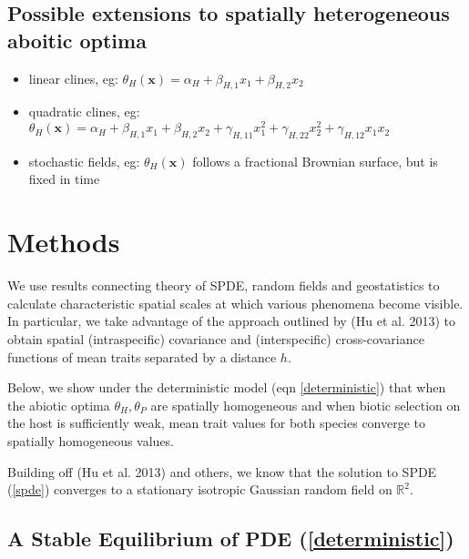 \documentclass{article}
\begin{document}
\hypertarget{possible-extensions-to-spatially-heterogeneous-aboitic-optima}{%
\subsection{Possible extensions to spatially heterogeneous aboitic
optima}\label{possible-extensions-to-spatially-heterogeneous-aboitic-optima}}

\begin{itemize}
\tightlist
\item
  linear clines, eg:
  \(\theta_H(\pmb x)=\alpha_H+\beta_{H,1}x_1+\beta_{H,2}x_2\)
\item
  quadratic clines, eg:
  \(\theta_H(\pmb x)=\alpha_H+\beta_{H,1}x_1+\beta_{H,2}x_2+\gamma_{H,11}x_1^2+\gamma_{H,22}x_2^2+\gamma_{H,12}x_1x_2\)
\item
  stochastic fields, eg: \(\theta_H(\pmb x)\) follows a fractional
  Brownian surface, but is fixed in time
\end{itemize}

\hypertarget{methods}{%
\section{Methods}\label{methods}}

We use results connecting theory of SPDE, random fields and
geostatistics to calculate characteristic spatial scales at which
various phenomena become visible. In particular, we take advantage of
the approach outlined by (Hu et al. 2013) to obtain spatial
(intraspecific) covariance and (interspecific) cross-covariance
functions of mean traits separated by a distance \(h\).

Below, we show under the deterministic model (eqn \ref{deterministic})
that when the abiotic optima \(\theta_H,\theta_P\) are spatially
homogeneous and when biotic selection on the host is sufficiently weak,
mean trait values for both species converge to spatially homogeneous
values.

Building off (Hu et al. 2013) and others, we know that the solution to
SPDE (\ref{spde}) converges to a stationary isotropic Gaussian random
field on \(\mathbb{R}^2\).

\hypertarget{a-stable-equilibrium-of-pde}{%
\subsection{\texorpdfstring{A Stable Equilibrium of PDE
(\ref{deterministic})}{A Stable Equilibrium of PDE ()}}\label{a-stable-equilibrium-of-pde}}
\end{document}
